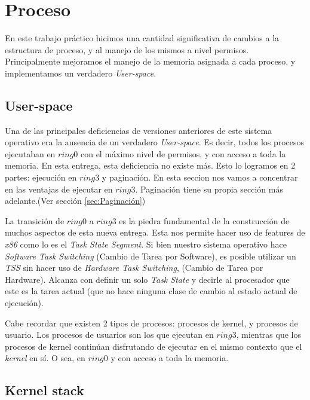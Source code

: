 \documentclass[a4paper,10pt]{article}
\begin{document}
\newpage

\section{Proceso}
\label{sec:Proceso}

En este trabajo práctico hicimos una cantidad significativa de cambios a la estructura de proceso, y al manejo de los mismos a nivel permisos.
Principalmente mejoramos el manejo de la memoria asignada a cada proceso, y implementamos un verdadero \textit{User-space}.

\subsection{User-space}
Una de las principales deficiencias de versiones anteriores de este sistema operativo era la ausencia de un verdadero \textit{User-space}.
Es decir, todos los procesos ejecutaban en $ring 0$ con el máximo nivel de permisos, y con acceso a toda la memoria.
En esta entrega, esta deficiencia no existe más.
Esto lo logramos en 2 partes: ejecución en $ring 3$ y paginación.
En esta seccion nos vamos a concentrar en las ventajas de ejecutar en $ring 3$. 
Paginación tiene su propia sección más adelante.(Ver sección \ref{sec:Paginación})


La transición de $ring 0$ a $ring 3$ es la piedra fundamental de la construcción de muchos aspectos de esta nueva entrega.
Esta nos permite hacer uso de features de \textit{x86} como lo es el \textit{Task State Segment}.
Si bien nuestro sistema operativo hace \textit{Software Task Switching} (Cambio de Tarea por Software), es posible utilizar un \textit{TSS} sin hacer uso de 
\textit{Hardware Task Switching}, (Cambio de Tarea por Hardware).
Alcanza con definir un solo \textit{Task State} y decirle al procesador que este es la tarea actual 
(que no hace ninguna clase de cambio al estado actual de ejecución).

Cabe recordar que existen 2 tipos de procesos: procesos de kernel, y procesos de usuario.
Los procesos de usuarios son los que ejecutan en $ring 3$, mientras que los procesos de kernel continúan disfrutando de ejecutar en el mismo contexto 
que el \textit{kernel} en sí. O sea, en $ring 0$ y con acceso a toda la memoria.

\subsection{Kernel stack}
\end{document}
